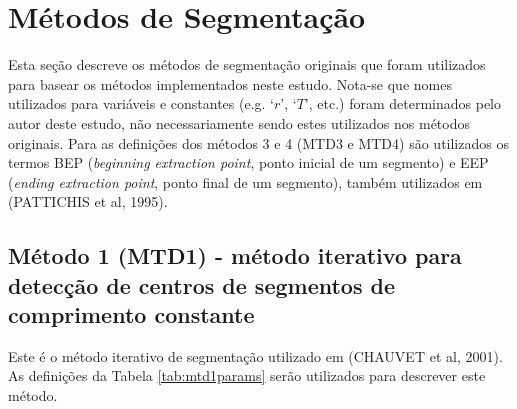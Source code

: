 \documentclass[
	12pt,				%
	openright,			%
	oneside,
	a4paper,			%
	english,			%
	francais,			%
	spanish,			%
	brazil				%
	]{abntex2}
\begin{document}
\section{Métodos de Segmentação}

	Esta seção descreve os métodos de segmentação originais que foram utilizados para basear os métodos implementados neste estudo. Nota-se que nomes utilizados para variáveis e constantes (e.g. `$r$', `$T$', etc.) foram determinados pelo autor deste estudo, não necessariamente sendo estes utilizados nos métodos originais. Para as definições dos métodos 3 e 4 (MTD3 e MTD4) são utilizados os termos BEP (\emph{beginning extraction point}, ponto inicial de um segmento) e EEP (\emph{ending extraction point}, ponto final de um segmento), também utilizados em (PATTICHIS et al, 1995).
	
\subsection{Método 1 (MTD1) - método iterativo para detecção de centros de segmentos de comprimento constante}

	Este é o método iterativo de segmentação utilizado em (CHAUVET et al, 2001). As definições da Tabela \ref{tab:mtd1params} serão utilizados para descrever este método.
	
\begin{table}[htb]
\end{table}
	
\end{document}
